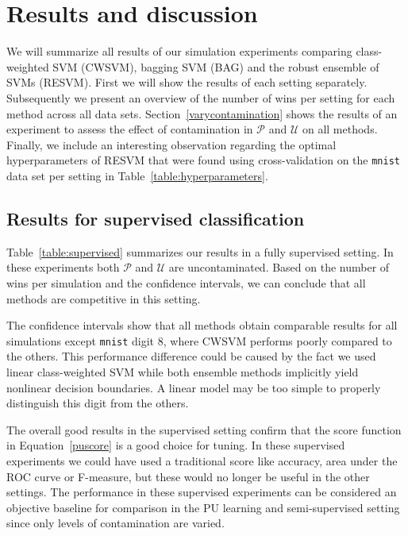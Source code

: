 \documentclass[preprint,elsarticle-num,12pt]{elsarticle}
\begin{document}


\newpage
\section{Results and discussion}
We will summarize all results of our simulation experiments comparing class-weighted SVM (CWSVM), bagging SVM (BAG) and the robust ensemble of SVMs (RESVM). First we will show the results of each setting separately. Subsequently we present an overview of the number of wins per setting for each method across all data sets. Section~\ref{varycontamination} shows the results of an experiment to assess the effect of contamination in $\mathcal{P}$ and $\mathcal{U}$ on all methods. Finally, we include an interesting observation regarding the optimal hyperparameters of RESVM that were found using cross-validation on the \texttt{mnist} data set per setting in Table~\ref{table:hyperparameters}.
\subsection{Results for supervised classification}
Table~\ref{table:supervised} summarizes our results in a fully supervised setting. In these experiments both $\mathcal{P}$ and $\mathcal{U}$ are uncontaminated. Based on the number of wins per simulation and the confidence intervals, we can conclude that all methods are competitive in this setting. 

The confidence intervals show that all methods obtain comparable results for all simulations except \texttt{mnist} digit $8$, where CWSVM performs poorly compared to the others. This performance difference could be caused by the fact we used linear class-weighted SVM while both ensemble methods implicitly yield nonlinear decision boundaries. A linear model may be too simple to properly distinguish this digit from the others.

The overall good results in the supervised setting confirm that the score function in Equation~\eqref{puscore} is a good choice for tuning. In these supervised experiments we could have used a traditional score like accuracy, area under the ROC curve or F-measure, but these would no longer be useful in the other settings. The performance in these supervised experiments can be considered an objective baseline for comparison in the PU learning and semi-supervised setting since only levels of contamination are varied.
\end{document}
